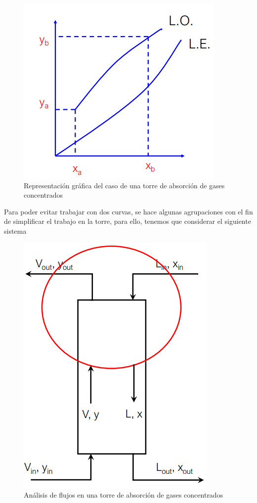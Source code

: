 \documentclass[11pt]{book}
\begin{document}
\begin{figure}
    \centering
    \includegraphics{img/absorcion/Absorcion_11.PNG}
    \caption{Representación gráfica del caso de una torre de absorción de gases concentrados}
    \label{fig:Absorcion_11}
\end{figure}

Para poder evitar trabajar con dos curvas, se hace algunas agrupaciones con el fin de simplificar el trabajo en la torre, para ello, tenemos que considerar el siguiente sistema

\begin{figure}
    \centering
    \includegraphics{img/absorcion/Absorcion_12.PNG}
    \caption{Análisis de flujos en una torre de absorción de gases concentrados}
    \label{fig:Absorcion_12}
\end{figure}
\end{document}
